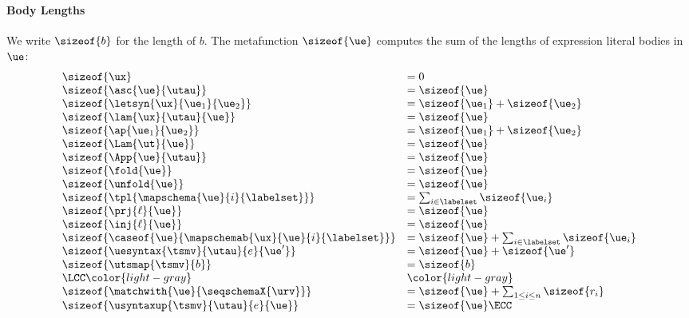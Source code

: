 \paragraph{Body Lengths}\label{appendix:SES-body-lengths}
We write $\sizeof{b}$ for the length of $b$. The metafunction $\sizeof{\ue}$ computes the sum of the lengths of expression literal bodies in $\ue$:
\[
\begin{array}{ll}
\sizeof{\ux} & = 0\\
\sizeof{\asc{\ue}{\utau}} & = \sizeof{\ue}\\
\sizeof{\letsyn{\ux}{\ue_1}{\ue_2}} & = \sizeof{\ue_1} + \sizeof{\ue_2}\\
\sizeof{\lam{\ux}{\utau}{\ue}} &= \sizeof{\ue}\\
\sizeof{\ap{\ue_1}{\ue_2}} & = \sizeof{\ue_1} + \sizeof{\ue_2}\\
\sizeof{\Lam{\ut}{\ue}} & = \sizeof{\ue}\\
\sizeof{\App{\ue}{\utau}} & = \sizeof{\ue}\\
\sizeof{\fold{\ue}} & = \sizeof{\ue}\\
\sizeof{\unfold{\ue}} & = \sizeof{\ue}\\
\sizeof{\tpl{\mapschema{\ue}{i}{\labelset}}} & = \sum_{i \in \labelset} \sizeof{\ue_i}\\
\sizeof{\prj{\ell}{\ue}} & = \sizeof{\ue}\\
\sizeof{\inj{\ell}{\ue}} & = \sizeof{\ue}\\
\sizeof{\caseof{\ue}{\mapschemab{\ux}{\ue}{i}{\labelset}}} & = \sizeof{\ue} + \sum_{i \in \labelset} \sizeof{\ue_i}\\
\sizeof{\uesyntax{\tsmv}{\utau}{e}{\ue'}} & = \sizeof{\ue} + \sizeof{\ue'}\\
\sizeof{\utsmap{\tsmv}{b}} & = \sizeof{b}\\
\LCC \color{light-gray} & \color{light-gray}\\
\sizeof{\matchwith{\ue}{\seqschemaX{\urv}}} & = \sizeof{\ue} + \sum_{1 \leq i \leq n} \sizeof{r_i}\\
\sizeof{\usyntaxup{\tsmv}{\utau}{e}{\ue}} & = \sizeof{\ue}\ECC
\end{array}
\]
